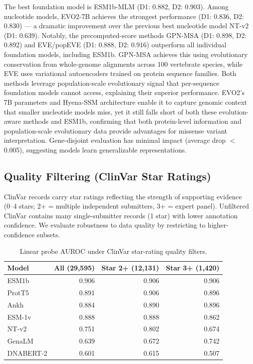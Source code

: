 \documentclass[9pt]{article}
\begin{document}
The best foundation model is ESM1b-MLM (D1: 0.882, D2: 0.903). Among nucleotide models, EVO2-7B achieves the strongest performance (D1: 0.836, D2: 0.830) --- a dramatic improvement over the previous best nucleotide model NT-v2 (D1: 0.639). Notably, the precomputed-score methods GPN-MSA (D1: 0.898, D2: 0.892) and EVE/popEVE (D1: 0.888, D2: 0.916) outperform all individual foundation models, including ESM1b. GPN-MSA achieves this using evolutionary conservation from whole-genome alignments across 100 vertebrate species, while EVE uses variational autoencoders trained on protein sequence families. Both methods leverage population-scale evolutionary signal that per-sequence foundation models cannot access, explaining their superior performance. EVO2's 7B parameters and Hyena-SSM architecture enable it to capture genomic context that smaller nucleotide models miss, yet it still falls short of both these evolution-aware methods and ESM1b, confirming that both protein-level information and population-scale evolutionary data provide advantages for missense variant interpretation. Gene-disjoint evaluation has minimal impact (average drop $<$ 0.005), suggesting models learn generalizable representations.

\subsection{Quality Filtering (ClinVar Star Ratings)}

ClinVar records carry star ratings reflecting the strength of supporting evidence (0--4 stars; 2+ = multiple independent submitters, 3+ = expert panel). Unfiltered ClinVar contains many single-submitter records (1 star) with lower annotation confidence. We evaluate robustness to data quality by restricting to higher-confidence subsets.

\begin{table}[h]
\centering
\caption{Linear probe AUROC under ClinVar star-rating quality filters.}
\label{tab:quality}
\small
\begin{tabular}{lrrr}
\toprule
\textbf{Model} & \textbf{All (29,595)} & \textbf{Star 2+ (12,131)} & \textbf{Star 3+ (1,420)} \\
\midrule
ESM1b & 0.906 & 0.906 & 0.906 \\
ProtT5 & 0.891 & 0.906 & 0.896 \\
Ankh & 0.884 & 0.890 & 0.896 \\
ESM-1v & 0.888 & 0.888 & 0.862 \\
NT-v2 & 0.751 & 0.802 & 0.674 \\
GenaLM & 0.639 & 0.672 & 0.742 \\
DNABERT-2 & 0.601 & 0.615 & 0.507 \\
\bottomrule
\end{tabular}
\end{table}
\end{document}

